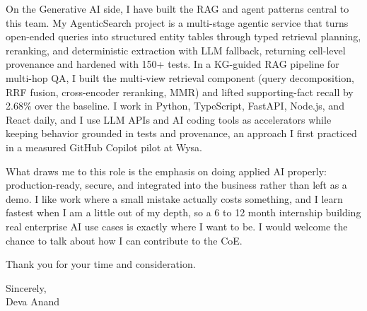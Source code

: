 \documentclass[letterpaper,11pt]{article}
\begin{document}
On the Generative AI side, I have built the RAG and agent patterns central to this team. My AgenticSearch project is a multi-stage agentic service that turns open-ended queries into structured entity tables through typed retrieval planning, reranking, and deterministic extraction with LLM fallback, returning cell-level provenance and hardened with 150+ tests. In a KG-guided RAG pipeline for multi-hop QA, I built the multi-view retrieval component (query decomposition, RRF fusion, cross-encoder reranking, MMR) and lifted supporting-fact recall by 2.68\% over the baseline. I work in Python, TypeScript, FastAPI, Node.js, and React daily, and I use LLM APIs and AI coding tools as accelerators while keeping behavior grounded in tests and provenance, an approach I first practiced in a measured GitHub Copilot pilot at Wysa.

What draws me to this role is the emphasis on doing applied AI properly: production-ready, secure, and integrated into the business rather than left as a demo. I like work where a small mistake actually costs something, and I learn fastest when I am a little out of my depth, so a 6 to 12 month internship building real enterprise AI use cases is exactly where I want to be. I would welcome the chance to talk about how I can contribute to the CoE.

Thank you for your time and consideration.

\vspace{6pt}

Sincerely, \\
Deva Anand
\end{document}

